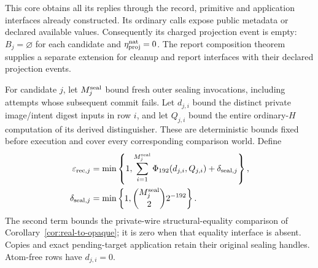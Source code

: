 \documentclass[pdflatex]{sn-jnl}
\theoremstyle{thmstyleone}
\theoremstyle{thmstylethree}
\theoremstyle{thmstyletwo}
\begin{document}
This core obtains all its replies through the record, primitive and
application interfaces already constructed. Its ordinary calls expose
public metadata or declared available values. Consequently its charged
projection event is empty: $B_j=\varnothing$ for each candidate and
$\eta_{\rm proj}^{\rm nat}=0$. The report composition theorem supplies a
separate extension for cleanup and report interfaces with their declared
projection events.

For candidate $j$, let $M_j^{\rm seal}$ bound fresh outer sealing
invocations, including attempts whose subsequent commit fails. Let
$d_{j,i}$ bound the distinct private image/intent digest inputs in row $i$,
and let $Q_{j,i}$ bound the entire ordinary-$H$ computation of its derived
distinguisher. These are deterministic bounds fixed before execution and
cover every corresponding comparison world. Define
\begin{equation}
\begin{split}
 \varepsilon_{{\rm rec},j}
 &=\min\left\{1,
     \sum_{i=1}^{M_j^{\rm seal}}\Phi_{192}(d_{j,i},Q_{j,i})
       +\delta_{{\rm seal},j}\right\},\\
 \delta_{{\rm seal},j}
 &=\min\left\{1,\binom{M_j^{\rm seal}}{2}2^{-192}\right\}.
\end{split}
\label{eq:live-core-record-cost}
\end{equation}
The second term bounds the private-wire structural-equality comparison of
Corollary~\ref{cor:real-to-opaque}; it is zero when that equality interface
is absent. Copies and exact pending-target application retain their
original sealing handles. Atom-free rows have $d_{j,i}=0$.
\end{document}
